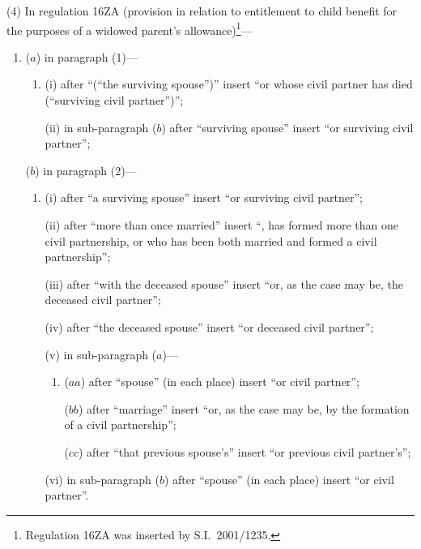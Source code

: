 \documentclass[12pt,a4paper]{article}
\begin{document}
(4) In regulation 16ZA (provision in relation to entitlement to child benefit for the purposes of a widowed parent’s allowance)\footnote{Regulation 16ZA was inserted by S.I.\ 2001/1235.}—
\begin{enumerate}\item[]
($a$) in paragraph (1)—
\begin{enumerate}\item[]
(i) after “(“the surviving spouse”)” insert “or whose civil partner has died (“surviving civil partner”)”;

(ii) in sub-paragraph ($b$)  after “surviving spouse” insert “or surviving civil partner”;
\end{enumerate}

($b$) in paragraph (2)—
\begin{enumerate}\item[]
(i) after “a surviving spouse” insert “or surviving civil partner”;

(ii) after “more than once married” insert “, has formed more than one civil partnership, or who has been both married and formed a civil partnership”;

(iii) after “with the deceased spouse” insert “or, as the case may be, the deceased civil partner”;

(iv) after “the deceased spouse” insert “or deceased civil partner”;

(v) in sub-paragraph ($a$)—
\begin{enumerate}\item[]
($aa$) after “spouse” (in each place) insert “or civil partner”;

($bb$) after “marriage” insert “or, as the case may be, by the formation of a civil partnership”;

($cc$) after “that previous spouse's” insert “or previous civil partner's”;
\end{enumerate}

(vi) in sub-paragraph ($b$)  after “spouse” (in each place) insert “or civil partner”.
\end{enumerate}
\end{enumerate}
\end{document}
